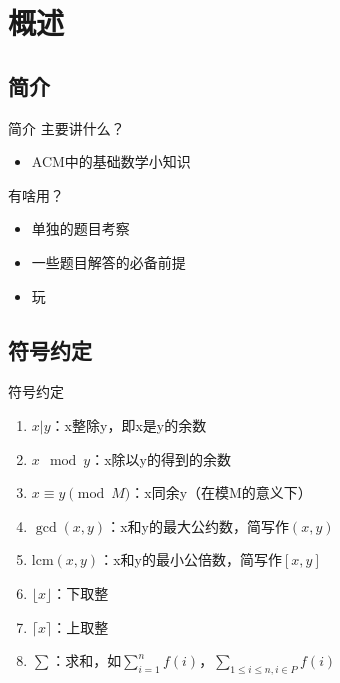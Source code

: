 \section{概述}
\subsection{简介}
\begin{frame}{简介}
主要讲什么？
\begin{itemize}
  \item ACM中的基础数学小知识
\end{itemize}
\pause
有啥用？
\begin{itemize}
  \item 单独的题目考察
  \item 一些题目解答的必备前提
  \item 玩
\end{itemize}
\end{frame}


\subsection{符号约定}
\begin{frame}{符号约定}
\begin{enumerate}
  \item $x|y$：x整除y，即x是y的余数
  \item $x\mod y$：x除以y的得到的余数
  \item $x\equiv y \pmod{M}$：x同余y（在模M的意义下）
  \item $\gcd(x,y)$：x和y的最大公约数，简写作$(x,y)$
  \item $\text{lcm}(x,y)$：x和y的最小公倍数，简写作$[x,y]$
  \item $\lfloor x \rfloor$：下取整
  \item $\lceil x \rceil$：上取整
  \item $\sum$：求和，如$\sum\limits_{i=1}^{n}f(i)$，$\sum\limits_{1\leq i\leq n, i\in P}f(i)$
\end{enumerate}

\end{frame}